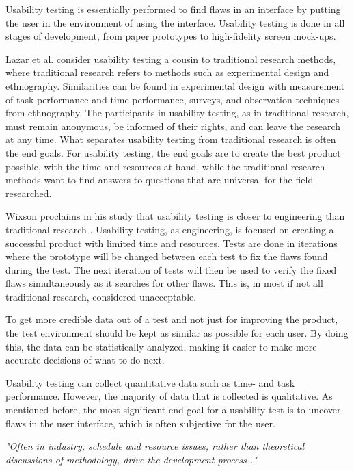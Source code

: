 Usability testing is essentially performed to find flaws in an interface by putting the user in the environment of using the interface. Usability testing is done in all stages of development, from paper prototypes to high-fidelity screen mock-ups. 

Lazar et al.\cite[Chapter~10]{lazar2017research}  consider usability testing a cousin to traditional research methods, where traditional research refers to methods such as experimental design\cite[Chapter~3]{lazar2017research}  and ethnography\cite[Chapter~9]{lazar2017research}.
Similarities can be found in experimental design with measurement of task performance and time performance, surveys, and observation techniques from ethnography. The participants in usability testing, as in traditional research, must remain anonymous, be informed of their rights, and can leave the research at any time. What separates usability testing from traditional research is often the end goals. For usability testing, the end goals are to create the best product possible, with the time and resources at hand, while the traditional research methods want to find answers to questions that are universal for the field researched. 
	
Wixson proclaims in his study that usability testing is closer to engineering than traditional research \cite{wixon2003evaluating}. Usability testing, as engineering, is focused on creating a successful product with limited time and resources. Tests are done in iterations where the prototype will be changed between each test to fix the flaws found during the test. The next iteration of tests will then be used to verify the fixed flaws simultaneously as it searches for other flaws. This is, in most if not all traditional research, considered unacceptable. 

To get more credible data out of a test and not just for improving the product, the test environment should be kept as similar as possible for each user. By doing this, the data can be statistically analyzed, making it easier to make more accurate decisions of what to do next.

Usability testing can collect quantitative data such as time- and task performance. However, the majority of data that is collected is qualitative. As mentioned before, the most significant end goal for a usability test is to uncover flaws in the user interface, which is often subjective for the user. 

\textit{"Often in industry, schedule and resource issues, rather than theoretical discussions of methodology, drive the development process \cite{wixon2003evaluating}."}

